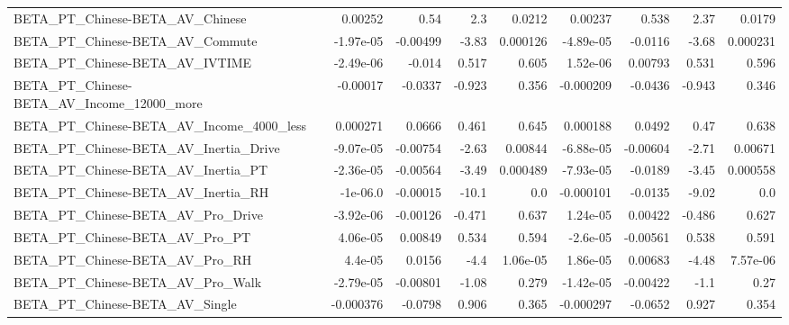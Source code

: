 \begin{tabular}{lrrrrrrrr}
BETA\_PT\_Chinese-BETA\_AV\_Chinese                    &     0.00252 &         0.54 &      2.3 &   0.0212 &    0.00237 &       0.538 &         2.37 &        0.0179 \\
BETA\_PT\_Chinese-BETA\_AV\_Commute                    &   -1.97e-05 &     -0.00499 &    -3.83 & 0.000126 &  -4.89e-05 &     -0.0116 &        -3.68 &      0.000231 \\
BETA\_PT\_Chinese-BETA\_AV\_IVTIME                     &   -2.49e-06 &       -0.014 &    0.517 &    0.605 &   1.52e-06 &     0.00793 &        0.531 &         0.596 \\
BETA\_PT\_Chinese-BETA\_AV\_Income\_12000\_more          &    -0.00017 &      -0.0337 &   -0.923 &    0.356 &  -0.000209 &     -0.0436 &       -0.943 &         0.346 \\
BETA\_PT\_Chinese-BETA\_AV\_Income\_4000\_less           &    0.000271 &       0.0666 &    0.461 &    0.645 &   0.000188 &      0.0492 &         0.47 &         0.638 \\
BETA\_PT\_Chinese-BETA\_AV\_Inertia\_Drive              &   -9.07e-05 &     -0.00754 &    -2.63 &  0.00844 &  -6.88e-05 &    -0.00604 &        -2.71 &       0.00671 \\
BETA\_PT\_Chinese-BETA\_AV\_Inertia\_PT                 &   -2.36e-05 &     -0.00564 &    -3.49 & 0.000489 &  -7.93e-05 &     -0.0189 &        -3.45 &      0.000558 \\
BETA\_PT\_Chinese-BETA\_AV\_Inertia\_RH                 &    -1e-06.0 &     -0.00015 &    -10.1 &      0.0 &  -0.000101 &     -0.0135 &        -9.02 &           0.0 \\
BETA\_PT\_Chinese-BETA\_AV\_Pro\_Drive                  &   -3.92e-06 &     -0.00126 &   -0.471 &    0.637 &   1.24e-05 &     0.00422 &       -0.486 &         0.627 \\
BETA\_PT\_Chinese-BETA\_AV\_Pro\_PT                     &    4.06e-05 &      0.00849 &    0.534 &    0.594 &   -2.6e-05 &    -0.00561 &        0.538 &         0.591 \\
BETA\_PT\_Chinese-BETA\_AV\_Pro\_RH                     &     4.4e-05 &       0.0156 &     -4.4 & 1.06e-05 &   1.86e-05 &     0.00683 &        -4.48 &      7.57e-06 \\
BETA\_PT\_Chinese-BETA\_AV\_Pro\_Walk                   &   -2.79e-05 &     -0.00801 &    -1.08 &    0.279 &  -1.42e-05 &    -0.00422 &         -1.1 &          0.27 \\
BETA\_PT\_Chinese-BETA\_AV\_Single                     &   -0.000376 &      -0.0798 &    0.906 &    0.365 &  -0.000297 &     -0.0652 &        0.927 &         0.354 \\

\end{tabular}
